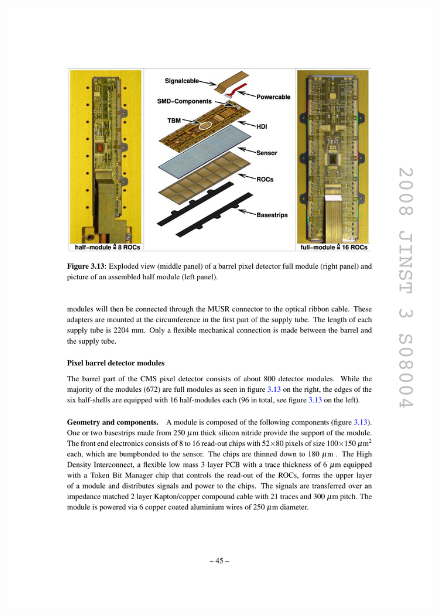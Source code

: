 \begin{figure}[hbtp]
  \begin{center}
    \includegraphics[width=1.5\cmsFigWidth]{figures/cms-pixel-bpixmodule}

\end{center}
\end{figure}
